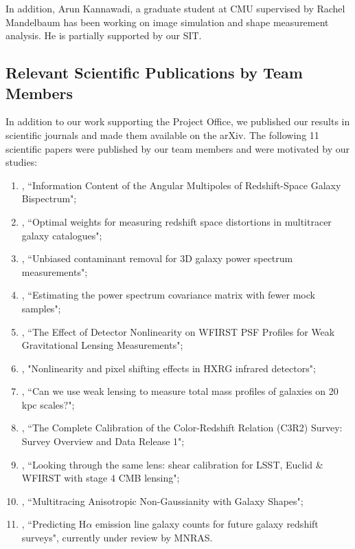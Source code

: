 In addition, Arun Kannawadi, a graduate student at CMU supervised by Rachel Mandelbaum has been working on image simulation and shape measurement analysis. He is partially supported by our SIT.

\subsection{Relevant Scientific Publications by Team Members}

In addition to our work supporting the Project Office, we published our results in scientific journals and made them available on the arXiv. The following 11 scientific papers were published by our team members and were motivated by our studies:

\begin{enumerate}
\item \citet{2017MNRAS.467..928G}, ``Information Content of the Angular Multipoles of Redshift-Space Galaxy Bispectrum";
\item \citet{2016MNRAS.463.2708P}, ``Optimal weights for measuring redshift space distortions in multitracer galaxy catalogues";
\item \citet{2016MNRAS.463..467K}, ``Unbiased contaminant removal for 3D galaxy power spectrum measurements";
\item \citet{2016MNRAS.457..993P}, ``Estimating the power spectrum covariance matrix with fewer mock samples";
\item \citet{2016PASP..128j4001P}, ``The Effect of Detector Nonlinearity on WFIRST PSF Profiles for Weak Gravitational Lensing Measurements";
\item \citet{2017JInst..12C4009P}, "Nonlinearity and pixel shifting effects in HXRG infrared detectors";
\item \citet{2015MNRAS.449.2128K}, ``Can we use weak lensing to measure total mass profiles of galaxies on 20 kpc scales?";
\item \citet{Masters2017}, ``The Complete Calibration of the Color-Redshift Relation (C3R2) Survey: Survey Overview and Data Release 1";
\item \citet{Schaan:2016ois}, ``Looking through the same lens: shear calibration for LSST, Euclid \& WFIRST with stage 4 CMB lensing";
\item \citet{Chisari:2016xki}, ``Multitracing Anisotropic Non-Gaussianity with Galaxy Shapes";
\item \citet{Merson2017}, ``Predicting H$\alpha$ emission line galaxy counts for future galaxy redshift surveys", currently under review by MNRAS.
\end{enumerate}

